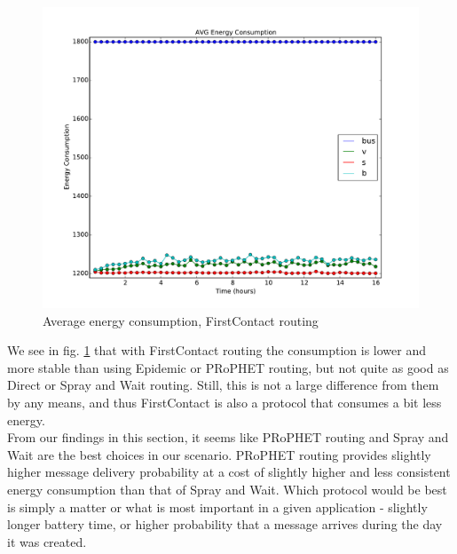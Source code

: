 \documentclass[conference]{IEEEtran}
\begin{document}
\begin{figure}
  \includegraphics[scale=0.25, center]{../one_1.5.1-RC2/plots/FirstContact_AVG_ENERGY_CONSUMPTION.pdf}
  \caption{Average energy consumption, FirstContact routing}
  \label{fig:avg_consumpt:firstcontact}
\end{figure}

We see in fig. \ref{fig:avg_consumpt:firstcontact} that with FirstContact routing the consumption is lower and more stable than using Epidemic or PRoPHET routing, but not quite as good as Direct or Spray and Wait routing. Still, this is not a large difference from them by any means, and thus FirstContact is also a protocol that consumes a bit less energy.\\
%

From our findings in this section, it seems like PRoPHET routing and Spray and Wait are the best choices in our scenario. PRoPHET routing provides slightly higher message delivery probability at a cost of slightly higher and less consistent energy consumption than that of Spray and Wait. Which protocol would be best is simply a matter or what is most important in a given application - slightly longer battery time, or higher probability that a message arrives during the day it was created.
\end{document}
